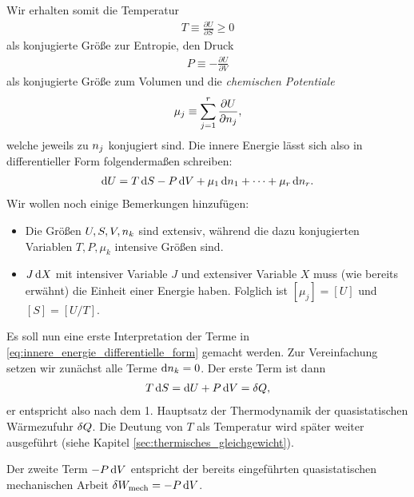 Wir erhalten somit die Temperatur
\begin{align}
    \label{eq:def_temperatur}
    T \equiv \frac{\partial U}{\partial S} \geq 0
\end{align}
als konjugierte Größe zur Entropie, den Druck
\begin{align}
    \label{eq:def_druck}
    P \equiv -\frac{\partial U}{\partial V}
\end{align}
als konjugierte Größe zum Volumen und die \emph{chemischen Potentiale}
\begin{align}
    \label{eq:def_chemische_potentiale}
    \mu_j \equiv \sum_{j = 1}^r \frac{\partial U}{\partial n_j},
\end{align}
welche jeweils zu $n_j$ konjugiert sind.
Die innere Energie lässt sich also in differentieller Form folgendermaßen schreiben:
\begin{align}
    \label{eq:innere_energie_differentielle_form}
    \mathop{}\!\mathrm{d} U = T\mathop{}\!\mathrm{d} S - P \mathop{}\!\mathrm{d} V + \mu_1 \mathop{}\!\mathrm{d} n_1 + \cdots + \mu_r \mathop{}\!\mathrm{d} n_r.
\end{align}
Wir wollen noch einige Bemerkungen hinzufügen:
\begin{itemize}
    \item Die Größen $U, S,V,n_k$ sind extensiv, während die dazu konjugierten Variablen $T,P,\mu_k$ intensive Größen sind.
    \item $J\mathop{}\!\mathrm{d} X$ mit intensiver Variable $J$ und extensiver Variable $X$ muss (wie bereits erwähnt) die Einheit einer Energie haben. Folglich ist $[\mu_j] = [U]$ und $[S]=[U/T]$.
\end{itemize}

Es soll nun eine erste Interpretation der Terme in \eqref{eq:innere_energie_differentielle_form} gemacht werden.
Zur Vereinfachung setzen wir zunächst alle Terme $\mathop{}\!\mathrm{d} n_k=0$.
Der erste Term ist dann
\begin{align*}
    T\mathop{}\!\mathrm{d} S = \mathop{}\!\mathrm{d} U+ P\mathop{}\!\mathrm{d} V = \mathop{}\!\delta Q,
\end{align*}
er entspricht also nach dem 1. Hauptsatz der Thermodynamik der quasistatischen Wärmezufuhr $\mathop{}\!\delta Q$.
Die Deutung von $T$ als Temperatur wird später weiter ausgeführt (siehe Kapitel \ref{sec:thermisches_gleichgewicht}).

Der zweite Term $-P\mathop{}\!\mathrm{d} V$ entspricht der bereits eingeführten quasistatischen mechanischen Arbeit $\mathop{}\!\delta W_\mathrm{mech}=-P\mathop{}\!\mathrm{d} V$.

